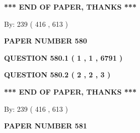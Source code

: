 \documentclass[12pt]{article}
\begin{document}
  
   
   
 \vspace{0.2in}
 
   
   
   
   
\vspace{1.0in} 
{\textbf{\large{ *** END OF PAPER, THANKS *** }}} 
   
   
\hspace{1.0in} By: 
 239 ( 416 ,  613 )
   
   
   
   
\newpage 
\setcounter{page}{ 
   580001 } 
   
   
   
   
 {\textbf{ \Large{ PAPER NUMBER  580  }}}
   
   
\vspace{0.2in}
   
   
   
   
   
   
 \vspace{0.2in}
 
 
 
 
   
   
  
\vspace{0.2in}
  
{\textbf{\Large{QUESTION
580.1 
 ( 1 , 1 , 6791 )
}}}
  
  
  
\vspace{0.2in}
  
{\textbf{\Large{QUESTION
580.2 
 ( 2 , 2 , 3 )
}}}
  
  
   
   
 \vspace{0.2in}
 
   
   
   
   
\vspace{1.0in} 
{\textbf{\large{ *** END OF PAPER, THANKS *** }}} 
   
   
\hspace{1.0in} By: 
 239 ( 416 ,  613 )
   
   
   
   
\newpage 
\setcounter{page}{ 
   581001 } 
   
   
   
   
 {\textbf{ \Large{ PAPER NUMBER  581  }}}
   
\end{document}

